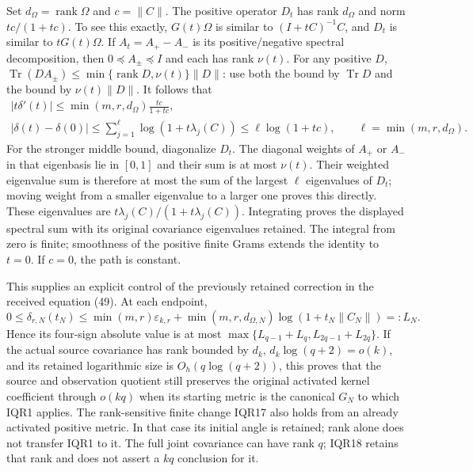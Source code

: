 \documentclass[11pt]{article}
\begin{document}
Set $d_\Omega=\operatorname{rank}\Omega$ and $c=\|C\|$.
The positive operator $D_t$ has rank $d_\Omega$ and norm
$tc/(1+tc)$. To see this exactly, $G(t)\Omega$ is similar to
$(I+tC)^{-1}C$, and $D_t$ is similar to $tG(t)\Omega$.
If $A_t=A_+-A_-$ is its positive/negative spectral decomposition,
then $0\preceq A_\pm\preceq I$ and each has rank $\nu(t)$.
For any positive $D$,
$\operatorname{Tr}(DA_\pm)\le
\min\{\operatorname{rank}D,\nu(t)\}\|D\|$:
use both the bound by $\operatorname{Tr}D$ and the bound by
$\nu(t)\|D\|$. It follows that
\[
\begin{gathered}
|t\delta'(t)|
\le\min(m,r,d_\Omega)\frac{tc}{1+tc},\\
|\delta(t)-\delta(0)|
\le\sum_{j=1}^{\ell}\log(1+t\lambda_j(C))
\le\ell\log(1+tc),\qquad \ell=\min(m,r,d_\Omega).
\end{gathered}
\tag{IQR17}
\]
For the stronger middle bound, diagonalize $D_t$. The diagonal weights
of $A_+$ or $A_-$ in that eigenbasis lie in $[0,1]$ and their sum
is at most $\nu(t)$. Their weighted eigenvalue sum is therefore at most
the sum of the largest $\ell$ eigenvalues of $D_t$; moving weight from
a smaller eigenvalue to a larger one proves this directly.
These eigenvalues are $t\lambda_j(C)/(1+t\lambda_j(C))$.
Integrating proves the displayed spectral sum with its original
covariance eigenvalues retained.
The integral from zero is finite; smoothness of the positive finite
Grams extends the identity to $t=0$. If $c=0$, the path is constant.

This supplies an explicit control of the previously retained correction
in the received equation (49). At each endpoint,
\[
0\le\delta_{r,N}(t_N)\le
\min(m,r)\varepsilon_{k,r}
+\min(m,r,d_{\Omega,N})\log(1+t_N\|C_N\|)=:L_N .
\tag{IQR18}
\]
Hence its four-sign absolute value is at most
$\max\{L_{q-1}+L_q,L_{2q-1}+L_{2q}\}$.
If the actual source covariance has rank bounded by $d_k$,
$d_k\log(q+2)=o(k)$, and its retained logarithmic size is
$O_h(q\log(q+2))$, this proves that the source and observation
quotient still preserves the original activated kernel coefficient
through $o(kq)$ when its starting metric is the canonical $G_N$
to which IQR1 applies. The rank-sensitive finite change IQR17
also holds from an already activated positive metric. In that case its
initial angle is retained; rank alone does not transfer IQR1 to it.
The full joint covariance can have rank $q$; IQR18 retains that rank
and does not assert a $kq$ conclusion for it.
\end{document}
